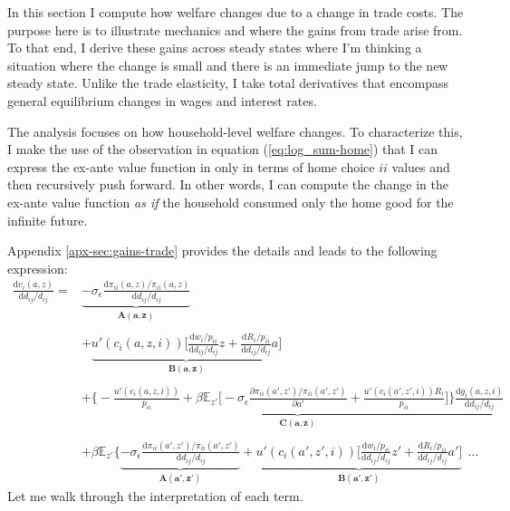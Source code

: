 \documentclass[12pt,pdftex]{article}
\begin{document}
\begin{onehalfspacing}
In this section I compute how welfare changes due to a change in trade costs. The purpose here is to illustrate mechanics and where the gains from trade arise from. To that end, I derive these gains across steady states where I'm thinking a situation where the change is small and there is an immediate jump to the new steady state.  Unlike the trade elasticity, I take total derivatives that encompass general equilibrium changes in wages and interest rates.

The analysis focuses on how household-level welfare changes. To characterize this, I make the use of the observation in equation (\ref{eq:log_sum-home}) that I can express the ex-ante value function in only in terms of home choice $ii$ values and then recursively push forward. In other words, I can compute the change in the ex-ante value function \emph{as if} the household consumed only the home good for the infinite future.

Appendix \ref{apx-sec:gains-trade} provides the details and leads to the following expression:
{\small
\begin{align}
\frac{\mathrm{d} v_i(a, z)}{\mathrm{d} d_{ij} / d_{ij}} =& \underbrace{-\sigma_{\epsilon} \frac{\mathrm{d} \pi_{ii}(a,z) / \pi_{ii}(a,z)}{\mathrm{d}d_{ij} / d_{ij}}}_{\mathbf{A(a,z)}} \label{eq:welfare-vterms} \\
\nonumber \\
& + \underbrace{u'(c_{i}(a,z,i)) \bigg[ \frac{\mathrm{d} w_{i} / p_{ii}}{\mathrm{d} d_{ij} / d_{ij}}z  +  \frac{\mathrm{d} R_{i} / p_{ii}}{\mathrm{d} d_{ij} / d_{ij}} a  \bigg]}_{\mathbf{B(a,z)}} \nonumber \\
\nonumber \\
& + \underbrace{\bigg \{- \frac{u'(c_{i}(a,z,i))}{p_{ii}} + \beta \mathbb{E}_{z'} \bigg [-\sigma_{\epsilon} \frac{\partial \pi_{ii}(a',z') / \pi_{ii}(a',z')}{\partial a'} + \frac{u'(c_{i}(a',z',i))R_{i}}{p_{ii}} \bigg ] \bigg \}\frac{\mathrm{d} g_{i}(a,z,i)}{\mathrm{d} d_{ij} / d_{ij}}}_{\mathbf{C(a,z)}} \nonumber \\
\nonumber \\
& + \beta \mathbb{E}_{z'} \bigg \{\underbrace{-\sigma_{\epsilon} \frac{\mathrm{d} \pi_{ii}(a',z') / \pi_{ii}(a',z')}{\mathrm{d}d_{ij} / d_{ij}}}_{\mathbf{A(a',z')}} +  \underbrace{u'(c_{i}(a',z',i)) \bigg[ \frac{\mathrm{d} w_{i} / p_{ii}}{\mathrm{d} d_{ij} / d_{ij}}z'  +  \frac{\mathrm{d} R_{i} / p_{ii}}{\mathrm{d} d_{ij} / d_{ij}} a' \bigg]}_{\mathbf{B(a',z')}} \ \  \ldots \nonumber
\end{align}
}Let me walk through the interpretation of each term.



\end{onehalfspacing}
\end{document}
